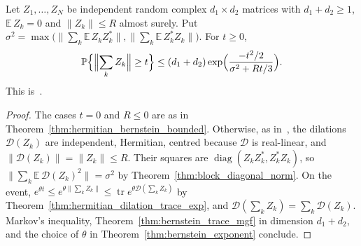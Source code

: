 \begin{theorem}
    \label{thm:rectangular_bernstein}
    \leanok
    Let $Z_1,\dots,Z_N$ be independent random complex $d_1\times d_2$ matrices with
    $d_1+d_2\ge1$, $\mathbb{E}\,Z_k=0$ and $\|Z_k\|\le R$ almost surely. Put
    $\sigma^{2}=\max\bigl(\bigl\|\sum_k\mathbb{E}\,Z_kZ_k^{*}\bigr\|,
        \bigl\|\sum_k\mathbb{E}\,Z_k^{*}Z_k\bigr\|\bigr)$. For $t\ge0$,
    \begin{align}
        \label{eq:rectangular_bernstein}
        \mathbb{P}\Bigl\{\Bigl\|\sum_kZ_k\Bigr\|\ge t\Bigr\}
        \le(d_1+d_2)\exp\Bigl(\frac{-t^{2}/2}{\sigma^{2}+Rt/3}\Bigr).
    \end{align}
    This is~\cite[Theorem~1.6]{Tropp2012User}.
\end{theorem}
\begin{proof}\leanok
    The cases $t=0$ and $R\le0$ are as in
    Theorem~\ref{thm:hermitian_bernstein_bounded}. Otherwise, as
    in~\cite[Theorem~1.6]{Tropp2012User}, the dilations $\mathcal{D}(Z_k)$ are
    independent, Hermitian, centred because $\mathcal{D}$ is real-linear, and
    $\|\mathcal{D}(Z_k)\|=\|Z_k\|\le R$. Their squares are
    $\operatorname{diag}(Z_kZ_k^{*},Z_k^{*}Z_k)$, so
    $\bigl\|\sum_k\mathbb{E}\,\mathcal{D}(Z_k)^{2}\bigr\|=\sigma^{2}$ by
    Theorem~\ref{thm:block_diagonal_norm}. On the event,
    $e^{\theta t}\le e^{\theta\|\sum_kZ_k\|}
        \le\operatorname{tr}e^{\theta\mathcal{D}(\sum_kZ_k)}$ by
    Theorem~\ref{thm:hermitian_dilation_trace_exp}, and
    $\mathcal{D}(\sum_kZ_k)=\sum_k\mathcal{D}(Z_k)$. Markov's inequality,
    Theorem~\ref{thm:bernstein_trace_mgf} in dimension $d_1+d_2$, and the choice
    of $\theta$ in Theorem~\ref{thm:bernstein_exponent} conclude.
\end{proof}

